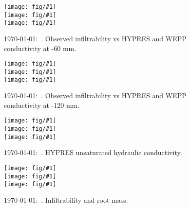 \documentclass[a4paper]{article}
\newcommand{\figright}[1]{\texttt{[image: fig/\#1]}}
\newcommand{\figctop}[1]{\hspace*{-1cm}\figright{#1}}
\newcommand{\figc}[1]{\vspace*{-1.6cm}\figctop{#1}}
\newcommand{\MyID}{\today:~}
\begin{document}
\begin{figure}[htbp]
  \begin{center}
    \figctop{K60_N1} \\
    \figc{K60_N2} \\
    \figc{K60_K3}
  \end{center}
  \caption{\MyID{}. Observed infiltrability vs HYPRES and WEPP conductivity at -60 mm.}
  \label{fig:K60_K}
\end{figure}

\begin{figure}[htbp]
  \begin{center}
    \figctop{K120_N1} \\
    \figc{K120_N2} \\
    \figc{K120_K3}
  \end{center}
  \caption{\MyID{}. Observed infiltrability vs HYPRES and WEPP conductivity at -120 mm.}
  \label{fig:K120_K}
\end{figure}

\begin{figure}[htbp]
  \begin{center}
    \figctop{KM_N1} \\
    \figc{KM_N2} \\
    \figc{KM_K3}
  \end{center}
  \caption{\MyID{}. HYPRES unsaturated hydraulic conductivity.}
  \label{fig:KM_K}
\end{figure}

\begin{figure}[htbp]
  \begin{center}
    \figctop{K15_N1_root} \\
    \figc{K15_N2_root} \\
    \figc{K15_K3_root}
  \end{center}
  \caption{\MyID{}. Infiltrability and root mass.}
  \label{fig:K15root_K}
\end{figure}
\end{document}
